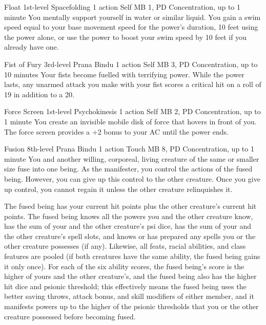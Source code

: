 \DndPowerHeader%
  {Float}
  {1st-level Spacefolding}
  {1 action}
  {Self}
  {MB 1, PD \lvlone}
  {Concentration, up to 1 minute}
You mentally support yourself in water or similar liquid.
You gain a swim speed equal to your base movement speed for
the power's duration, 10 feet using the power alone,
or use the power to boost your swim speed by 10 feet if you already have one.

\DndPowerHeader%
  {Fist of Fury}
  {3rd-level Prana Bindu}
  {1 action}
  {Self}
  {MB 3, PD \lvlthree}
  {Concentration, up to 10 minutes}
Your fists become fuelled with terrifying power.
While the power lasts,
any unarmed attack you make with your fist
scores a critical hit on a roll of
19 in addition to a 20.

\DndPowerHeader%
  {Force Screen}
  {1st-level Psychokinesis}
  {1 action}
  {Self}
  {MB 2, PD \lvlone}
  {Concentration, up to 1 minute}
You create an invisible mobile disk of force that hovers in front of you.
The force screen provides a +2 bonus to your AC until the power ends.

\DndPowerHeader%
  {Fusion}
  {8th-level Prana Bindu}
  {1 action}
  {Touch}
  {MB 8, PD \lvleight}
  {Concentration, up to 1 minute}
  You and another willing, corporeal, living creature
  of the same or smaller size fuse into one being.
  As the manifester,
  you control the actions of the fused being.
  However, you can give up this control to the other creature.
  Once you give up control,
  you cannot regain it unless the other creature relinquishes it.

  The fused being has your current hit points
  plus the other creature's current hit points.
  The fused being knows all the powers you
  and the other creature know,
  has the sum of your and the other creature's psi dice,
  has the sum of your and the other creature's spell slots,
  and knows or has prepared any spells you or the other creature possesses
  (if any).
  Likewise, all feats, racial abilities, and class features
  are pooled
  (if both creatures have the same ability,
  the fused being gains it only once).
  For each of the six ability scores,
  the fused being's score is the higher of yours
  and the other creature's,
  and the fused being also has the higher hit dice
  and psionic threshold;
  this effectively means the fused being uses
  the better saving throws,
  attack bonus,
  and skill modifiers of either member,
  and it manifests powers up to the higher of the psionic thresholds
  that you or the other creature possessed before becoming fused.
  
